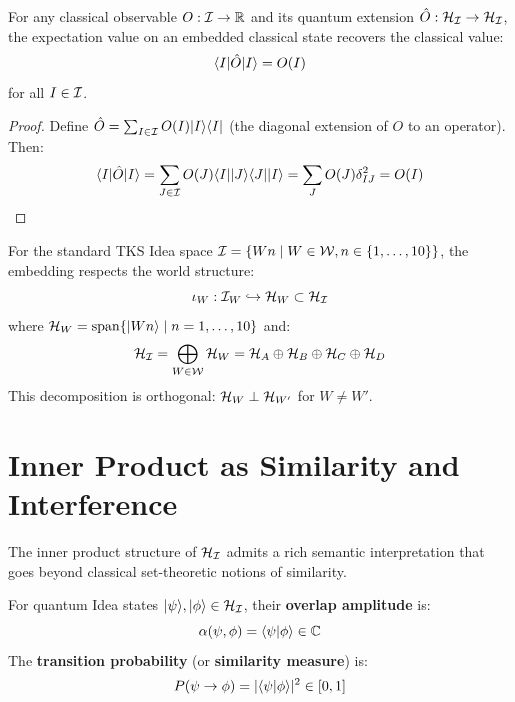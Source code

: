 \begin{theorem}
\label{thm:quantum-classical-limit}
For any classical observable $O : \mathcal{I} \to \mathbb{R}$ and its quantum extension $\hat{O} : \mathcal{H}_{\mathcal{I}} \to \mathcal{H}_{\mathcal{I}}$, the expectation value on an embedded classical state recovers the classical value:
\[
\langle I| \hat{O} |I\rangle = O(I)
\]
for all $I \in \mathcal{I}$.
\end{theorem}

\begin{proof}
Define $\hat{O} = \sum_{I \in \mathcal{I}} O(I) |I\rangle\langle I|$ (the diagonal extension of $O$ to an operator). Then:
\[
\langle I| \hat{O} |I\rangle = \sum_{J \in \mathcal{I}} O(J) \langle I| |J\rangle\langle J| |I\rangle = \sum_{J} O(J) \delta_{IJ}^2 = O(I)
\]
\end{proof}

\begin{definition}
\label{def:world-stratified}
For the standard TKS Idea space $\mathcal{I} = \{Wn \mid W \in \mathcal{W}, n \in \{1,\ldots,10\}\}$, the embedding respects the world structure:
\[
\iota_{W} : \mathcal{I}_W \hookrightarrow \mathcal{H}_W \subset \mathcal{H}_{\mathcal{I}}
\]
where $\mathcal{H}_W = \mathrm{span}\{|Wn\rangle \mid n = 1,\ldots,10\}$ and:
\[
\mathcal{H}_{\mathcal{I}} = \bigoplus_{W \in \mathcal{W}} \mathcal{H}_W = \mathcal{H}_A \oplus \mathcal{H}_B \oplus \mathcal{H}_C \oplus \mathcal{H}_D
\]
This decomposition is orthogonal: $\mathcal{H}_W \perp \mathcal{H}_{W'}$ for $W \neq W'$.
\end{definition}

\section{Inner Product as Similarity and Interference}
\label{sec:inner-product-interpretation}

The inner product structure of $\mathcal{H}_{\mathcal{I}}$ admits a rich semantic interpretation that goes beyond classical set-theoretic notions of similarity.

\begin{definition}
\label{def:idea-overlap}
For quantum Idea states $|\psi\rangle, |\phi\rangle \in \mathcal{H}_{\mathcal{I}}$, their \textbf{overlap amplitude} is:
\[
\alpha(\psi, \phi) = \langle \psi | \phi \rangle \in \mathbb{C}
\]
The \textbf{transition probability} (or \textbf{similarity measure}) is:
\[
P(\psi \to \phi) = |\langle \psi | \phi \rangle|^2 \in [0,1]
\]
\end{definition}

